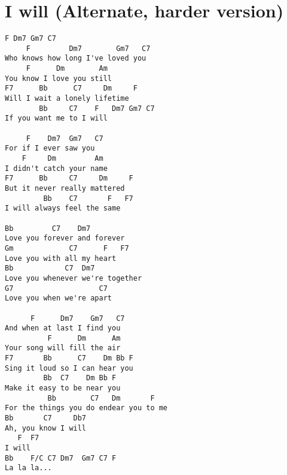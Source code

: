 \documentclass[leqno]{memoir}
\begin{document}
\chapter{I will (Alternate, harder version)}
\begin{verbatim}
F Dm7 Gm7 C7
     F         Dm7        Gm7   C7
Who knows how long I've loved you
     F      Dm        Am
You know I love you still
F7      Bb      C7     Dm     F
Will I wait a lonely lifetime
        Bb     C7    F   Dm7 Gm7 C7
If you want me to I will

     F    Dm7  Gm7   C7
For if I ever saw you
    F     Dm         Am
I didn't catch your name
F7      Bb     C7     Dm     F
But it never really mattered
         Bb    C7       F   F7
I will always feel the same

Bb         C7    Dm7
Love you forever and forever
Gm             C7      F   F7
Love you with all my heart
Bb            C7  Dm7      
Love you whenever we're together
G7                    C7
Love you when we're apart

      F      Dm7    Gm7   C7
And when at last I find you 
          F      Dm      Am
Your song will fill the air
F7       Bb      C7    Dm Bb F
Sing it loud so I can hear you
         Bb  C7    Dm Bb F
Make it easy to be near you
          Bb        C7   Dm       F
For the things you do endear you to me
Bb       C7     Db7
Ah, you know I will
   F  F7
I will
Bb    F/C C7 Dm7  Gm7 C7 F
La la la...
\end{verbatim}
\newpage
\end{document}
